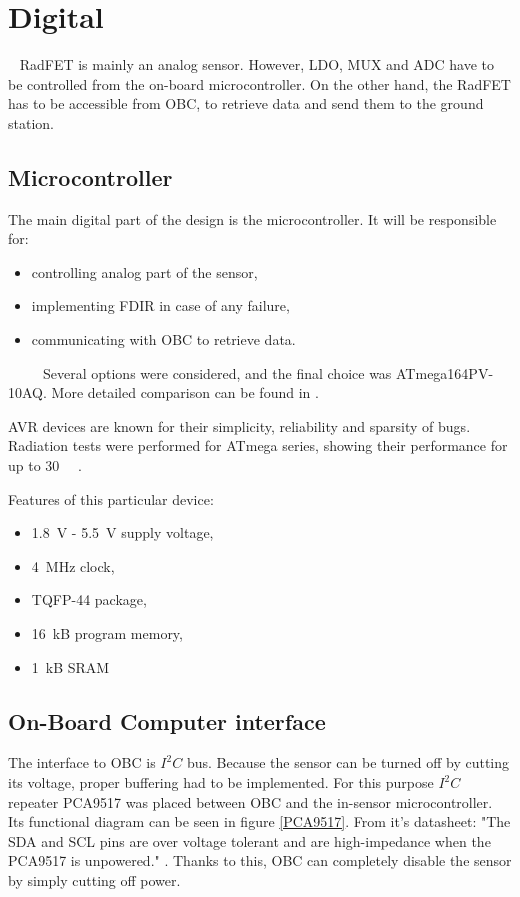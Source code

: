 \section{Digital}
    RadFET is mainly an analog sensor. However, LDO, MUX and ADC have to be controlled from the on-board microcontroller. On the other hand, the RadFET has to be accessible from OBC, to retrieve data and send them to the ground station.

    \subsection{Microcontroller}
        The main digital part of the design is the microcontroller. It will be responsible for:
        \begin{itemize}
            \item controlling analog part of the sensor,
            \item implementing FDIR in case of any failure,
            \item communicating with OBC to retrieve data.
        \end{itemize}

        Several options were considered, and the final choice was ATmega164PV-10AQ. More detailed comparison can be found in \cite{PWSAT_EPS_CDR}.

        AVR devices are known for their simplicity, reliability and sparsity of bugs. Radiation tests were performed for ATmega series, showing their performance for up to \SI{30}{\kilo\rad} \cite{ATMEGA128_radiation_tests}.

        Features of this particular device:
        \begin{itemize}
            \item \SI{1.8}{\volt} - \SI{5.5}{\volt} supply voltage,
            \item \SI{4}{\mega\hertz} clock,
            \item TQFP-44 package,
            \item \SI{16}{\kilo B} program memory,
            \item \SI{1}{\kilo B} SRAM
        \end{itemize}

    \subsection{On-Board Computer interface}
        The interface to OBC is $I^2C$ bus. Because the sensor can be turned off by cutting its voltage, proper buffering had to be implemented. For this purpose $I^2C$ repeater PCA9517 was placed between OBC and the in-sensor microcontroller. Its functional diagram can be seen in figure \ref{PCA9517}. From it's datasheet: "The SDA and SCL pins are over voltage tolerant and are high-impedance when the PCA9517 is unpowered." \cite{PCA9517_datasheet}. Thanks to this, OBC can completely disable the sensor by simply cutting off power.

